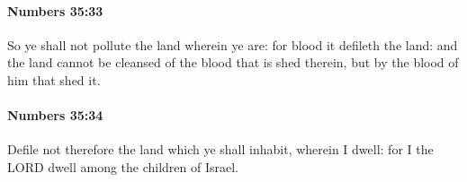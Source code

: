 		\paragraph{Numbers 35:33} %
			\label{NUMBERS-35-33}

			So ye shall not pollute the land wherein ye are: for blood it defileth the land: and the land cannot be cleansed of the blood that is shed therein, but by the blood of him that shed it.


		\paragraph{Numbers 35:34} %
			\label{NUMBERS-35-34}

			Defile not therefore the land which ye shall inhabit, wherein I dwell: for I the LORD dwell among the children of Israel.

